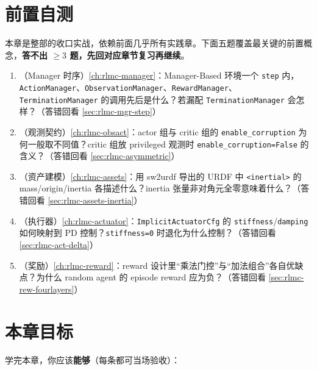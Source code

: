 \section{前置自测}
\label{sec:rlmc-diy-pretest}

本章是整部的收口实战，依赖前面几乎所有实践章。下面五题覆盖最关键的前置概念，\textbf{答不出 $\ge 3$ 题，先回对应章节复习再继续}。

\begin{practice}[开课前自测]
\begin{enumerate}
\item （Manager 时序）\cref{ch:rlmc-manager}：Manager-Based 环境一个 \texttt{step} 内，\verb|ActionManager|、\verb|ObservationManager|、\verb|RewardManager|、\verb|TerminationManager| 的调用先后是什么？若漏配 \verb|TerminationManager| 会怎样？（答错回看 \cref{sec:rlmc-mgr-step}）
\item （观测契约）\cref{ch:rlmc-obsact}：actor 组与 critic 组的 \verb|enable_corruption| 为何一般取不同值？critic 组放 privileged 观测时 \verb|enable_corruption=False| 的含义？（答错回看 \cref{sec:rlmc-asymmetric}）
\item （资产建模）\cref{ch:rlmc-assets}：用 sw2urdf 导出的 URDF 中 \verb|<inertial>| 的 mass/origin/inertia 各描述什么？inertia 张量非对角元全零意味着什么？（答错回看 \cref{sec:rlmc-assets-inertia}）
\item （执行器）\cref{ch:rlmc-actuator}：\verb|ImplicitActuatorCfg| 的 \verb|stiffness|/\verb|damping| 如何映射到 PD 控制？\verb|stiffness=0| 时退化为什么控制？（答错回看 \cref{sec:rlmc-act-delta}）
\item （奖励）\cref{ch:rlmc-reward}：reward 设计里“乘法门控”与“加法组合”各自优缺点？为什么 random agent 的 episode reward 应为负？（答错回看 \cref{sec:rlmc-rew-fourlayers}）
\end{enumerate}
\end{practice}

\section{本章目标}
\label{sec:rlmc-diy-goals}

学完本章，你应该\textbf{能够}（每条都可当场验收）：

